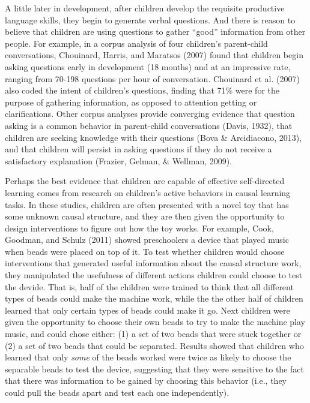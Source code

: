 \documentclass[english,man]{apa6}
\theoremstyle{definition}
\theoremstyle{definition}
\theoremstyle{definition}
\theoremstyle{remark}
\begin{document}
A little later in development, after children develop the requisite
productive language skills, they begin to generate verbal questions. And
there is reason to believe that children are using questions to gather
\enquote{good} information from other people. For example, in a corpus
analysis of four children's parent-child conversations, Chouinard,
Harris, and Maratsos (2007) found that children begin asking questions
early in development (18 months) and at an impressive rate, ranging from
70-198 questions per hour of conversation. Chouinard et al. (2007) also
coded the intent of children's questions, finding that 71\% were for the
purpose of gathering information, as opposed to attention getting or
clarifications. Other corpus analyses provide converging evidence that
question asking is a common behavior in parent-child conversations
(Davis, 1932), that children are seeking knowledge with their questions
(Bova \& Arcidiacono, 2013), and that children will persist in asking
questions if they do not receive a satisfactory explanation (Frazier,
Gelman, \& Wellman, 2009).

Perhaps the best evidence that children are capable of effective
self-directed learning comes from research on children's active
behaviors in causal learning tasks. In these studies, children are often
presented with a novel toy that has some unknown causal structure, and
they are then given the opportunity to design interventions to figure
out how the toy works. For example, Cook, Goodman, and Schulz (2011)
showed preschoolers a device that played music when beads were placed on
top of it. To test whether children would choose interventions that
generated useful information about the causal structure work, they
manipulated the usefulness of different actions children could choose to
test the devide. That is, half of the children were trained to think
that all different types of beads could make the machine work, while the
the other half of children learned that only certain types of beads
could make it go. Next children were given the opportunity to choose
their own beads to try to make the machine play music, and could chose
either: (1) a set of two beads that were stuck together or (2) a set of
two beads that could be separated. Results showed that children who
learned that only \emph{some} of the beads worked were twice as likely
to choose the separable beads to test the device, suggesting that they
were sensitive to the fact that there was information to be gained by
choosing this behavior (i.e., they could pull the beads apart and test
each one independently).
\end{document}
